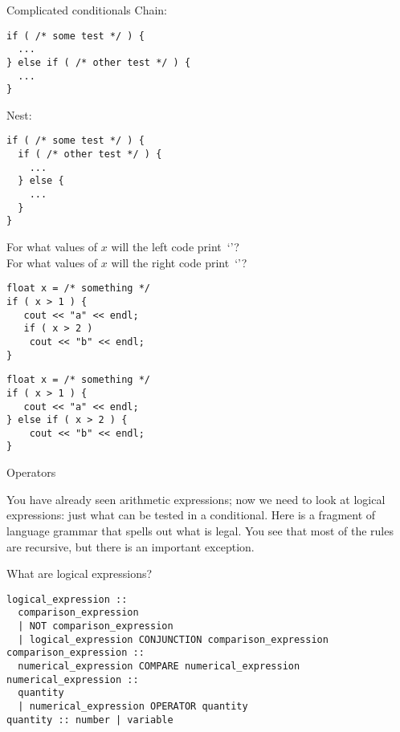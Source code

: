 \begin{slide}{Complicated conditionals}
  \label{sl:elseif}
  Chain:
\begin{lstlisting}
if ( /* some test */ ) {
  ...
} else if ( /* other test */ ) {
  ...
}
\end{lstlisting}
Nest:
\begin{lstlisting}
if ( /* some test */ ) {
  if ( /* other test */ ) {
    ...
  } else {
    ...
  }
}
\end{lstlisting}
\end{slide}

\begin{exercise}
  \label{ex:if-scope-ab}
  For what values of $x$ will the left code print~`'?\\
  For what values of $x$ will the right code print~`'?
  \begin{multicols}{2}
\begin{lstlisting}
float x = /* something */
if ( x > 1 ) {
   cout << "a" << endl;
   if ( x > 2 )
    cout << "b" << endl;
}
\end{lstlisting}
\columnbreak
\begin{lstlisting}
float x = /* something */
if ( x > 1 ) {
   cout << "a" << endl;
} else if ( x > 2 ) {
    cout << "b" << endl;
}
\end{lstlisting}
  \end{multicols}
\end{exercise}

 {Operators}

You have already seen arithmetic expressions; now we need to look at
logical expressions: just what can be tested in a conditional. 
Here is a fragment of language grammar that spells out what is
legal. You see that most of the rules are recursive, but there is an
important exception.

\begin{block}{What are logical expressions?}
  \label{sl:logical-syntax}
\begin{verbatim}
logical_expression :: 
  comparison_expression
  | NOT comparison_expression
  | logical_expression CONJUNCTION comparison_expression
comparison_expression :: 
  numerical_expression COMPARE numerical_expression
numerical_expression :: 
  quantity
  | numerical_expression OPERATOR quantity
quantity :: number | variable
\end{verbatim}
\end{block}

